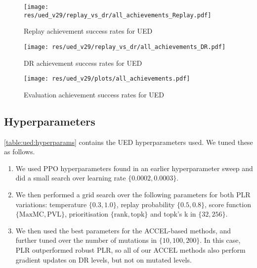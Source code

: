 \documentclass{article}
\theoremstyle{plain}
\theoremstyle{definition}
\theoremstyle{remark}
\begin{document}
\begin{figure*}
    \centering
        \texttt{[image: res/ued\_v29/replay\_vs\_dr/all\_achievements\_Replay.pdf]}
        \caption{Replay achievement success rates for UED}
        \label{fig:ued:replay_vs_dr:replay}
\end{figure*}
\begin{figure*}
        \texttt{[image: res/ued\_v29/replay\_vs\_dr/all\_achievements\_DR.pdf]}
        \caption{DR achievement success rates for UED}
        \label{fig:ued:replay_vs_dr:dr}
\end{figure*}
\begin{figure*}
        \texttt{[image: res/ued\_v29/plots/all\_achievements.pdf]}
        \caption{Evaluation achievement success rates for UED}
        \label{fig:ued:eval:all_achievements}
\end{figure*}


\subsection{Hyperparameters}
\cref{table:ued:hyperparams} contains the UED hyperparameters used. We tuned these as follows.
\begin{enumerate}
    \item We used PPO hyperparameters found in an earlier hyperparameter sweep and did a small search over learning rate $\{ 0.0002, 0.0003 \}$.
    \item We then performed a grid search over the following parameters for both PLR variations: temperature $\{ 0.3, 1.0 \}$, replay probability $\{ 0.5, 0.8 \}$, score function $\{ \text{MaxMC}, \text{PVL} \}$, prioritisation $\{ \text{rank}, \text{topk} \}$ and topk's k in $\{32, 256 \}$.
    \item We then used the best parameters for the ACCEL-based methods, and further tuned over the number of mutations in $\{10, 100, 200 \}$. In this case, PLR outperformed robust PLR, so all of our ACCEL methods also perform gradient updates on DR levels, but not on mutated levels.
\end{enumerate}
\end{document}
